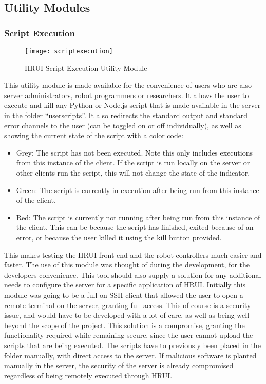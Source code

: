 \subsection{Utility Modules}
\subsubsection{Script Execution} \label{scriptexecution}
\begin{figure}[H]
\centering
\captionsetup{justification=centering}
\texttt{[image: scriptexecution]}
\caption{HRUI Script Execution Utility Module}
\end{figure}
This utility module is made available for the convenience of users who are also server administrators, robot programmers or 
researchers. It allows the user to execute and kill any Python or Node.js script that is made available in the server in the 
folder ``userscripts''. It also redirects the standard output and standard error channels to the user (can be toggled on or 
off individually), as well as showing the current state of the script with a color code:
\begin{itemize}
	\item Grey: The script has not been executed. Note this only includes executions from this instance of the client. If the 
	script is run locally on the server or other clients run the script, this will not change the state of the indicator.
	\item Green: The script is currently in execution after being run from this instance of the client.
	\item Red: The script is currently not running after being run from this instance of the client. This can be because the 
	script has finished, exited because of an error, or because the user killed it using the kill button provided.
\end{itemize}
This makes testing the HRUI front-end and the robot controllers much easier and faster. The use of this module was thought of 
during the development, for the developers convenience. This tool should also supply a solution for any additional needs to 
configure the server for a specific application of HRUI. Initially this module was going to be a full on SSH client that 
allowed the user to open a remote terminal on the server, granting full access. This of course is a security issue, and would 
have to be developed with a lot of care, as well as being well beyond the scope of the project. This solution is a 
compromise, granting the functionality required while remaining secure, since the user cannot upload the scripts that are 
being executed. The scripts have to previously been placed in the folder manually, with direct access to the server. If 
malicious software is planted manually in the server, the security of the server is already compromised regardless of being 
remotely executed through HRUI.\\

